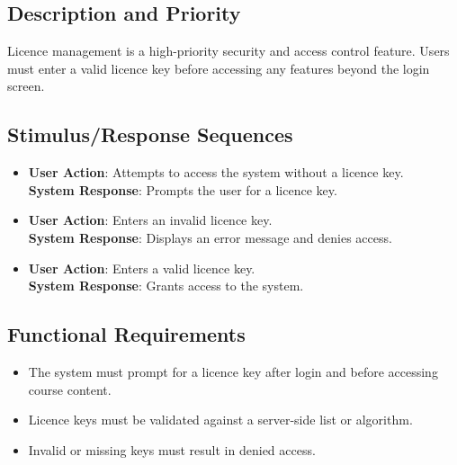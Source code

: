 \documentclass[a4paper, 11pt]{scrreprt}
\begin{document}
\subsection{Description and Priority}
Licence management is a high-priority security and access control feature. Users must enter a valid licence key before accessing any features beyond the login screen.

\subsection{Stimulus/Response Sequences}
\begin{itemize}
    \item \textbf{User Action}: Attempts to access the system without a licence key.\\
          \textbf{System Response}: Prompts the user for a licence key.
    \item \textbf{User Action}: Enters an invalid licence key.\\
          \textbf{System Response}: Displays an error message and denies access.
    \item \textbf{User Action}: Enters a valid licence key.\\
          \textbf{System Response}: Grants access to the system.
\end{itemize}

\subsection{Functional Requirements}
\begin{itemize}
    \item The system must prompt for a licence key after login and before accessing course content.
    \item Licence keys must be validated against a server-side list or algorithm.
    \item Invalid or missing keys must result in denied access.
\end{itemize}
\end{document}
